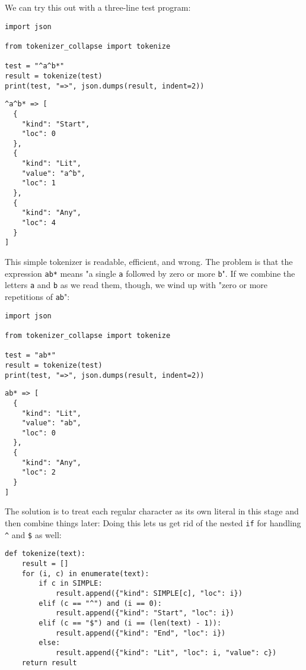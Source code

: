 \documentclass{scrbook}
\begin{document}
We can try this out with a three-line test program:


\begin{lstlisting}[frame=single,frameround=tttt]
import json

from tokenizer_collapse import tokenize

test = "^a^b*"
result = tokenize(test)
print(test, "=>", json.dumps(result, indent=2))
\end{lstlisting}



\begin{lstlisting}[frame=single,frameround=tttt]
^a^b* => [
  {
    "kind": "Start",
    "loc": 0
  },
  {
    "kind": "Lit",
    "value": "a^b",
    "loc": 1
  },
  {
    "kind": "Any",
    "loc": 4
  }
]
\end{lstlisting}



This simple tokenizer is readable, efficient, and wrong.
The problem is that the expression \texttt{ab*} means "a single \texttt{a} followed by zero or more \texttt{b}".
If we combine the letters \texttt{a} and \texttt{b} as we read them,
though,
we wind up with "zero or more repetitions of \texttt{ab}":


\begin{lstlisting}[frame=single,frameround=tttt]
import json

from tokenizer_collapse import tokenize

test = "ab*"
result = tokenize(test)
print(test, "=>", json.dumps(result, indent=2))
\end{lstlisting}



\begin{lstlisting}[frame=single,frameround=tttt]
ab* => [
  {
    "kind": "Lit",
    "value": "ab",
    "loc": 0
  },
  {
    "kind": "Any",
    "loc": 2
  }
]
\end{lstlisting}



The solution is to treat each regular character as its own literal in this stage
and then combine things later:
Doing this lets us get rid of the nested \texttt{if} for handling \texttt{{\textasciicircum}} and \texttt{\$} as well:


\begin{lstlisting}[frame=single,frameround=tttt]
def tokenize(text):
    result = []
    for (i, c) in enumerate(text):
        if c in SIMPLE:
            result.append({"kind": SIMPLE[c], "loc": i})
        elif (c == "^") and (i == 0):
            result.append({"kind": "Start", "loc": i})
        elif (c == "$") and (i == (len(text) - 1)):
            result.append({"kind": "End", "loc": i})
        else:
            result.append({"kind": "Lit", "loc": i, "value": c})
    return result
\end{lstlisting}
\end{document}
